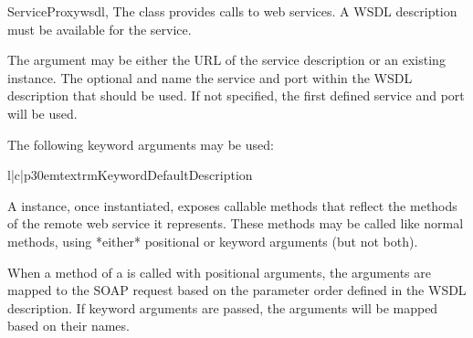 \begin{classdesc}{ServiceProxy}{wsdl,}
The  class provides calls to
web services. A WSDL description must be available for the 
service.

The  argument may be either the URL of the service description 
or an existing  instance. The optional  and 
 name the service and port within the WSDL description that 
should be used. If not specified, the first defined service and port 
will be used.

The following keyword arguments may be used:

\begin{tableiii}{l|c|p{30em}}{textrm}{Keyword}{Default}{Description}
\end{tableiii}

A  instance, once instantiated, exposes callable 
methods that reflect the methods of the remote web service it 
represents. These methods may be called like normal methods, using 
*either* positional or keyword arguments (but not both).

When a method of a  is called with positional 
arguments, the arguments are mapped to the SOAP request based on 
the parameter order defined in the WSDL description. If keyword 
arguments are passed, the arguments will be mapped based on their 
names.

\end{classdesc}

